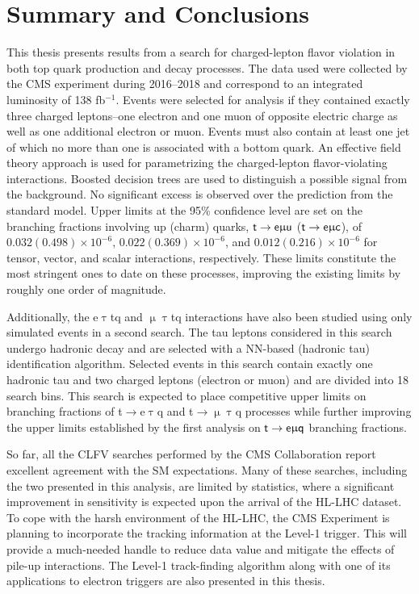 \chapter{Summary and Conclusions}
\label{chap:Conclusion}

This thesis presents results from a search for charged-lepton flavor violation in both top quark production and decay processes. The data used were collected by the \ac{CMS} experiment during 2016--2018 and correspond to an integrated luminosity of 138 fb$^{-1}$. Events were selected for analysis if they contained exactly three charged leptons--one electron and one muon of opposite electric charge as well as one additional electron or muon. Events must also contain at least one jet of which no more than one is associated with a bottom quark. An effective field theory approach is used for parametrizing the charged-lepton flavor-violating interactions. Boosted decision trees are used to distinguish a possible signal from the background. No significant excess is observed over the prediction from the standard model. Upper limits at the 95\% confidence level are set on the branching fractions involving up (charm) quarks, $\textsf{t}\rightarrow\textsf{e}\upmu\textsf{u}$ ($\textsf{t}\rightarrow\textsf{e}\upmu\textsf{c}$), of $0.032 (0.498) \times 10^{-6}$, $0.022 (0.369) \times 10^{-6}$, and $0.012 (0.216) \times 10^{-6}$ for tensor, vector, and scalar interactions, respectively. These limits constitute the most stringent ones to date on these processes, improving the existing limits by roughly one order of magnitude.

Additionally, the e$\uptau$tq and $\upmu\uptau$tq interactions have also been studied using only simulated events in a second search. The tau leptons considered in this search undergo hadronic decay and are selected with a \ac{NN}-based (hadronic tau) identification algorithm. Selected events in this search contain exactly one hadronic tau and two charged leptons (electron or muon) and are divided into 18 search bins. This search is expected to place competitive upper limits on branching fractions of t$\rightarrow$e$\uptau$q and t$\rightarrow\upmu\uptau$q processes while further improving the upper limits established by the first analysis on $\textsf{t}\rightarrow\textsf{e}\upmu\textsf{q}$ branching fractions. 

So far, all the \ac{CLFV} searches performed by the \ac{CMS} Collaboration report excellent agreement with the \ac{SM} expectations. Many of these searches, including the two presented in this analysis, are limited by statistics, where a significant improvement in sensitivity is expected upon the arrival of the \ac{HL-LHC} dataset. To cope with the harsh environment of the \ac{HL-LHC}, the \ac{CMS} Experiment is planning to incorporate the tracking information at the Level-1 trigger. This will provide a much-needed handle to reduce data value and mitigate the effects of pile-up interactions. The Level-1 track-finding algorithm along with one of its applications to electron triggers are also presented in this thesis.